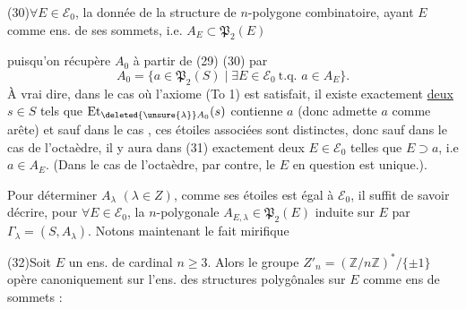 
(30)\qquad $\forall E\in\mathcal E_0$, la donnée de la structure de $n$-polygone combinatoire, ayant $E$ comme ens. de ses sommets, i.e.  $A_E\subset\mathfrak P_2(E)$

puisqu'on récupère $A_0$ à partir de (29) (30) par
\[
A_0=\{a\in\mathfrak P_2(S)\mid\exists E\in\mathcal E_0\ \text{t.q. }a\in A_E\}.\tag*{(31)}
\]
À vrai dire,  dans le cas où l'axiome (To 1) est satisfait, il existe exactement \uline{deux} $s\in S$ tels que $\mathrm{Et}_{\deleted{\unsure{\lambda}}A_0}(s)$ contienne $a$ (donc admette $a$ comme arête) et sauf dans le cas , ces étoiles associées sont distinctes, donc sauf dans le cas de l'octaèdre, il y aura dans (31) exactement deux $E\in\mathcal E_0$ telles que $E\supset a$, i.e $a\in A_E$. (Dans le cas de l'octaèdre, par contre, le $E$ en question est unique.).

Pour déterminer   $A_\lambda$ $(\lambda\in Z)$, comme  ses étoiles est égal à $\mathcal E_0$, il suffit de savoir décrire,  pour $\forall E\in\mathcal E_0$, la  $n$-polygonale $A_{E,\lambda}\in\mathfrak P_2(E)$ induite sur $E$ par $\Gamma_\lambda=(S,A_\lambda)$. Notons maintenant le fait mirifique

(32)\qquad Soit $E$ un ens.  de cardinal $n\geqslant3$. Alors le groupe $Z'_n=(\mathbb Z/n\mathbb Z)^*/\{\pm1\}$ opère canoniquement sur l'ens.  des structures polygônales sur $E$ comme ens de sommets :


